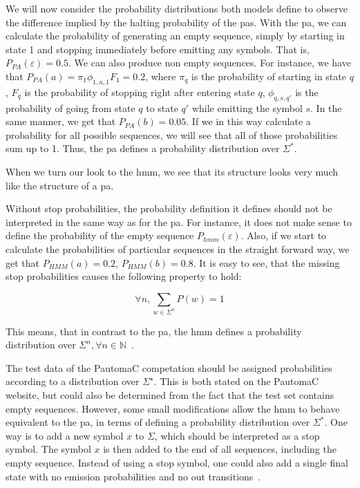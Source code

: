 We will now consider the probability distributions both models define to observe the difference implied by the halting probability of the \glspl{pa}.
With the \gls{pa}, we can calculate the probability of generating an empty sequence, simply by starting in state 1 and stopping immediately before emitting any symbols. That is, $P_{PA}(\varepsilon) = 0.5$. We can also produce non empty sequences. For instance, we have that $P_{PA}(a) = \pi_1\phi_{1,a,1}F_1 = 0.2$, where $\pi_q$ is the probability of starting in state $q$, $F_q$ is the probability of stopping right after entering state $q$, $\phi_{q,s,q'}$ is the probability of going from state $q$ to state $q'$ while emitting the symbol $s$.
In the same manner, we get that $P_{PA}(b) = 0.05$.
If we in this way calculate a probability for all possible sequences, we will see that all of those probabilities sum up to 1. Thus, the \gls{pa} defines a probability distribution over $\Sigma^\ast$\cite{Dupont:2005:LPA:1746577.1746601}.

When we turn our look to the \gls{hmm}, we see that its structure looks very much like the structure of a \gls{pa}.

Without stop probabilities, the probability definition it defines should not be interpreted in the same way as for the \gls{pa}. For instance, it does not make sense to define the probability of the empty sequence $P_{hmm}(\varepsilon)$. Also, if we start to calculate the probabilities of particular sequences in the straight forward way, we get that $P_{HMM}(a) = 0.2$, $P_{HMM}(b) = 0.8$. It is easy to see, that the missing stop probabilities causes the following property to hold:

\[\forall n, \sum_{w \in \Sigma^n} P(w) = 1\]

This means, that in contrast to the \gls{pa}, the \gls{hmm} defines a probability distribution over $\Sigma^n, \forall n \in \mathbb{N}$~\cite{Dupont:2005:LPA:1746577.1746601}.

The test data of the PautomaC competation should be assigned probabilities according to a distribution over $\Sigma^\star$.
This is both stated on the PautomaC website, but could also be determined from the fact that the test set contains empty sequences. However, some small modifications allow the \gls{hmm} to behave equivalent to the \gls{pa}, in terms of defining a probability distribution over $\Sigma^\ast$. One way is to add a new symbol $x$ to $\Sigma$, which should be interpreted as a stop symbol. The symbol $x$ is then added to the end of all sequences, including the empty sequence. Instead of using a stop symbol, one could also add a single final state with no emission probabilities and no out transitions~\cite{Dupont:2005:LPA:1746577.1746601}.